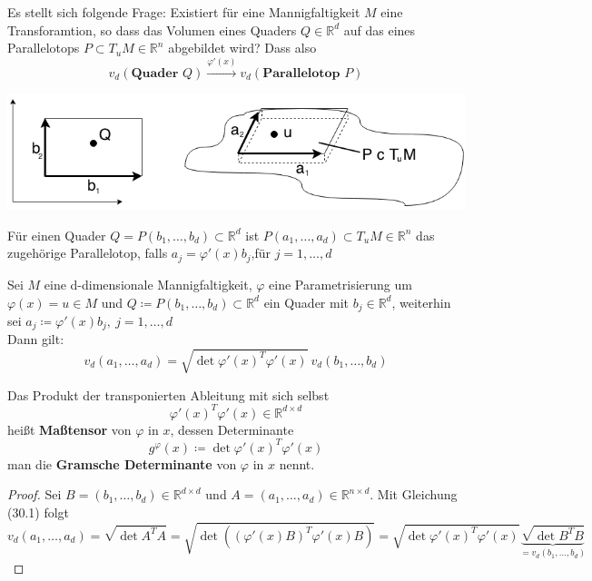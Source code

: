 Es stellt sich folgende Frage: Existiert für eine Mannigfaltigkeit $M$ eine Transforamtion, so dass das
Volumen eines Quaders $Q \in \mathbb{R}^d $ auf das eines Parallelotops 
$P \subset T_uM \in \mathbb{R}^n $ abgebildet wird? Dass also
\begin{equation*}
v_d(\textbf{Quader }Q) \xrightarrow{\varphi'(x)} v_d(\textbf{Parallelotop } P)
\end{equation*}
\begin{center}
	\includegraphics[scale=.5]{pictures/004-02.png}
\end{center}
Für einen Quader $Q = P(b_1, \ldots, b_d) \subset \mathbb{R}^d $ ist 
$P(a_1, \ldots, a_d) \subset T_uM \in \mathbb{R}^n $ das zugehörige Parallelotop, falls
$a_j = \varphi'(x) b_j $,für $ j=1, \ldots, d $

\begin{satz}
    Sei $M$ eine d-dimensionale Mannigfaltigkeit, $\varphi$ eine Parametrisierung um $\varphi(x) = u \in M $
    und $Q \coloneqq P(b_1, \ldots, b_d) \subset \mathbb{R}^d $ ein Quader mit $b_j \in \mathbb{R}^d$, weiterhin sei $a_j \coloneqq \varphi'(x) b_j,\ j= 1, \ldots, d $ \\
    Dann gilt:
    \begin{equation}
        v_d(a_1, \ldots, a_d) = 
        \sqrt{\det \varphi'(x)^T \varphi'(x)}\ v_d(b_1, \ldots, b_d)
    \end{equation}
\end{satz}

\begin{definition}[Maßtensor] Das Produkt der transponierten Ableitung mit sich selbst
	\begin{equation*}
		\varphi'(x)^T \varphi'(x) \in \mathbb{R}^{d \times d}
	\end{equation*}
    heißt \textbf{Maßtensor}    von $\varphi$ in $x$, dessen Determinante
    \begin{equation*}
		g^\varphi (x) \coloneqq \det \varphi'(x)^T \varphi'(x)
	\end{equation*}
    man die \textbf{Gramsche Determinante} von $\varphi$ in $x$ nennt.
\end{definition}
\newpage
\begin{proof}
    Sei $B = (b_1, \ldots, b_d) \in \mathbb{R}^{d \times d}$ und 
    $A = (a_1, \ldots, a_d) \in \mathbb{R}^{n \times d}$. Mit Gleichung (30.1) folgt
	\begin{equation*}
		v_d(a_1, \ldots, a_d) 
    	= \sqrt{\det A^T A} = \sqrt{\det ((\varphi'(x) B)^T \varphi'(x) B)}
   		= \sqrt{\det \varphi'(x)^T \varphi'(x)} 
   		\underbrace{\sqrt{\det B^T B}}_{= v_d(b_1, \ldots, b_d)}
	\end{equation*}	    
\end{proof}

